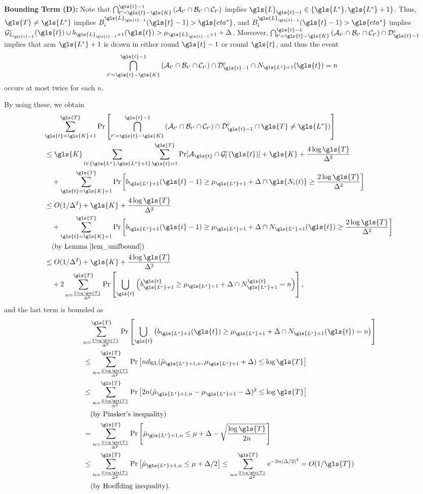 \textbf{Bounding Term (D):}
Note that $\bigcap_{t'=\gls{t}-\gls{K}}^{\gls{t}-1} \left(\mA_{t'} \cap \mB_{t'} \cap \mC_{t'}\right)$ implies $\gls{L}_{\gls{t}-1} \in \{\gls{L^*}, \gls{L^*}+1\}$. Thus, ${\gls{T}} \ne \gls{L^*}$ implies $B_i^{\gls{L}_{\gls{t}-1}}(\gls{t}-1) > \gls{eta^*}$, and $B_i^{\gls{L}_{\gls{t}-1}}(\gls{t}-1) > \gls{eta^*}$ implies $\mG_{L_{\gls{t}-1}}^c(\gls{t}) \cup b_{\gls{L}_{\gls{t}-1}+1}(\gls{t}) > \mu_{\gls{L}_{\gls{t}-1}+1} + \Delta$. Moreover, $\bigcap_{t'=\gls{t}-\gls{K}}^{\gls{t}-1} \left(\mA_{t'} \cap \mB_{t'} \cap \mC_{t'}\right) \cap \mD^c_{\gls{t}-1}$ implies that arm $\gls{L^*}+1$ is drawn in either round $\gls{t}-1$ or round $\gls{t}$, and thus the event
\[
\bigcap_{t'=\gls{t}-\gls{K}}^{\gls{t}-1} \left(\mA_{t'} \cap \mB_{t'} \cap \mC_{t'}\right) \cap \mD^c_{\gls{t}-1} \cap N_{\gls{L^*}+1}(\gls{t})=n
\]
occurs at most twice for each $n$.

By using these, we obtain
\begin{align}
\lefteqn{
\sum_{\gls{t}=\gls{K}+1}^{\gls{T}} \Pr\left[ \bigcap_{t'=\gls{t}-\gls{K}}^{\gls{t}-1} \left(\mA_{t'} \cap \mB_{t'} \cap \mC_{t'}\right) \cap \mD^c_{\gls{t}-1} \cap {\gls{T}} \ne \gls{L^*})\right]
} \nn
&\le \gls{K} \sum_{l \in \{\gls{L^*}, \gls{L^*}+1\}}\sum_{\gls{t}=1}^{\gls{T}} \Pr[\mA_{\gls{t}} \cap \mG_l^c(\gls{t})] + \gls{K} + \frac{4\log \gls{T}}{\Delta^2}\nn
&\ \ \  + \sum_{\gls{t}=\gls{K}+1}^{\gls{T}} \Pr\left[b_{\gls{L^*}+1}(\gls{t}-1) \ge \mu_{\gls{L^*}+1} + \Delta \cap \gls{N_i(t)} \ge \frac{2\log \gls{T}}{\Delta^2}\right] \nn
&\le O(1/\Delta^2) + \gls{K} + \frac{4\log \gls{T}}{\Delta^2} \nn
&\ \ \ + \sum_{\gls{t}=\gls{K}+1}^{\gls{T}} \Pr\left[b_{\gls{L^*}+1}(\gls{t}-1) \ge \mu_{\gls{L^*}+1} + \Delta \cap N_{\gls{L^*}+1}(\gls{t}) \ge \frac{2\log \gls{T}}{\Delta^2}\right]\nn
&\ \ \ \text{(by Lemma \ref{lem_unifbound})} \nn
&\le O(1/\Delta^2) + \gls{K} + \frac{4\log \gls{T}}{\Delta^2}\nn
&\ \ \ + 2\sum_{n=\frac{2\log \gls{T}}{\Delta^2}}^{\gls{T}} \Pr\left[\bigcup_{\gls{t}} \left( b_{\gls{L^*}+1}^{\gls{t}} \ge \mu_{\gls{L^*}+1} + \Delta \cap N_{\gls{L^*}+1}^{\gls{t}} = n\right)\right], \label{preg_terms_four}
\end{align}
and the last term is bounded as
\begin{align}
\lefteqn{
\sum_{n=\frac{2\log \gls{T}}{\Delta^2}}^{\gls{T}} \Pr\left[\bigcup_{\gls{t}} \left( b_{\gls{L^*}+1}(\gls{t}) \ge \mu_{\gls{L^*}+1} + \Delta \cap N_{\gls{L^*}+1}(\gls{t}) = n\right)\right]
}\nn
&\le  \sum_{n=\frac{2\log \gls{T}}{\Delta^2}}^{\gls{T}} \Pr\left[n \KL(\hat{\mu}_{\gls{L^*}+1,n}, \mu_{\gls{L^*}+1}+\Delta) \le \log \gls{T}\right]\nn
&\le  \sum_{n=\frac{2\log \gls{T}}{\Delta^2}}^{\gls{T}} \Pr\left[2n(\hat{\mu}_{\gls{L^*}+1,n} - \mu_{\gls{L^*}+1} -\Delta)^2 \le \log \gls{T}\right]\nn
&\ \ \text{ (by Pinsker's inequality)}\nn
&= \sum_{n=\frac{2\log \gls{T}}{\Delta^2}}^{\gls{T}} \Pr\left[\hat{\mu}_{\gls{L^*}+1,n} \le \mu + \Delta - \sqrt{\frac{\log \gls{T}}{2 n}} \right]\nn
&\le \sum_{n=\frac{2\log \gls{T}}{\Delta^2}}^{\gls{T}} \Pr\left[\hat{\mu}_{\gls{L^*}+1,n} \le \mu + \Delta/2 \right] \le \sum_{n=\frac{2\log \gls{T}}{\Delta^2}}^{\gls{T}} \e^{-2 n (\Delta/2)^2} = O(1/\gls{T})\nn
&\ \ \text{ (by Hoeffding inequality)}.
\end{align}

